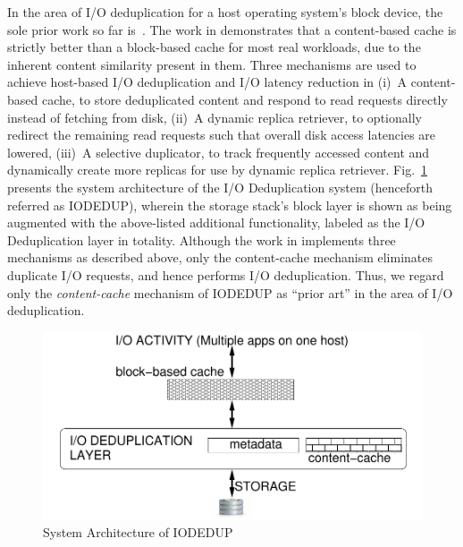 In the area of I/O deduplication for a host operating system's block
device, the sole prior work so far is~\cite{iodedup}.
The work in \cite{iodedup} demonstrates that a content-based cache is
strictly better than a block-based cache for most real workloads, due to
the inherent content similarity present in them.
Three mechanisms are used to achieve 
host-based I/O deduplication
and I/O latency reduction in \cite{iodedup}\textemdash{}(i)~A
content-based cache, to store deduplicated content and respond to read
requests directly instead of fetching from disk,
(ii)~A dynamic replica retriever, to optionally
redirect the remaining read requests such that overall disk access
latencies are lowered, (iii)~A selective duplicator, to track frequently
accessed content and dynamically create more replicas for use
by dynamic replica retriever.
Fig.~\ref{fig:iodedup-arch}
presents the system architecture of the I/O Deduplication system
(henceforth referred as IODEDUP), wherein
the storage stack's block layer is shown as being augmented with the
above-listed additional functionality, 
labeled as the I/O Deduplication layer in totality.
Although the work in \cite{iodedup} implements three mechanisms as
described above, only the content-cache mechanism eliminates duplicate
I/O requests, and hence performs I/O deduplication.
Thus, we regard only the \textit{content-cache} 
mechanism of IODEDUP as ``prior art'' in the area of I/O 
deduplication.

\begin{figure}[t]
\centering
\includegraphics[scale=0.65]{confided-figures/main/sys-arch-iodedup-host.pdf}
\vspace{-0.15in}
\caption{System Architecture of IODEDUP}
\label{fig:iodedup-arch}
\end{figure}


